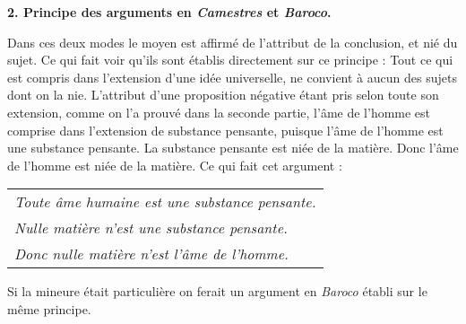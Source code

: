 \newpage

\begin{center}{\bfseries 2. Principe des arguments en \emph{Camestres} et \emph{Baroco}.}\end{center}

Dans ces deux modes le moyen est affirmé de l'attribut de la conclusion, et nié du sujet. Ce qui fait voir qu'ils sont établis directement sur ce principe : Tout ce qui est compris dans l'extension d'une idée universelle, ne convient à aucun des sujets dont on la nie. L'attribut d'une proposition négative étant pris selon toute son extension, comme on l'a prouvé dans la seconde partie, l'âme de l'homme est comprise dans l'extension de substance pensante, puisque l'âme de l'homme est une substance pensante. La substance pensante est niée de la matière. Donc l'âme de l'homme est niée de la matière. Ce qui fait cet argument :
\begin{center}
	\begin{tabular}{l}
		\emph{Toute âme humaine est une substance pensante.} \\
		\emph{Nulle matière n'est une substance pensante.} \\
		\emph{Donc nulle matière n'est l'âme de l'homme.} \\
	\end{tabular}
\end{center}

Si la mineure était particulière on ferait un argument en \emph{Baroco} établi sur le même principe.


